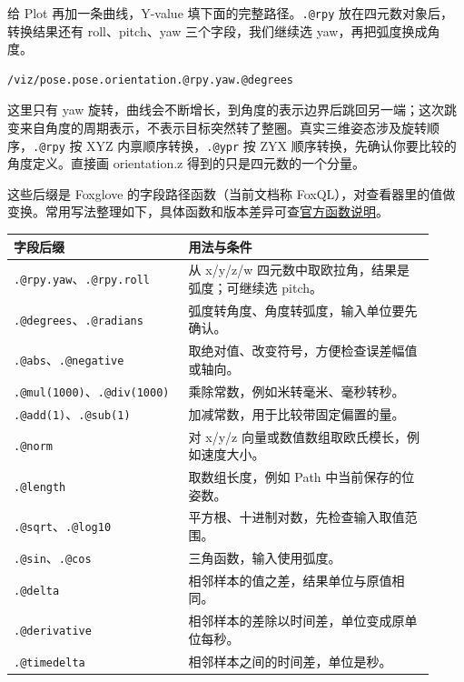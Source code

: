 \begin{example}
给 Plot 再加一条曲线，Y-value 填下面的完整路径。\texttt{.@rpy} 放在四元数对象后，转换结果还有 roll、pitch、yaw 三个字段，我们继续选 yaw，再把弧度换成角度。
\begin{lstlisting}[language={}]
/viz/pose.pose.orientation.@rpy.yaw.@degrees
\end{lstlisting}
这里只有 yaw 旋转，曲线会不断增长，到角度的表示边界后跳回另一端；这次跳变来自角度的周期表示，不表示目标突然转了整圈。真实三维姿态涉及旋转顺序，\texttt{.@rpy} 按 XYZ 内禀顺序转换，\texttt{.@ypr} 按 ZYX 顺序转换，先确认你要比较的角度定义。直接画 orientation.z 得到的只是四元数的一个分量。

这些后缀是 Foxglove 的字段路径函数（当前文档称 FoxQL），对查看器里的值做变换。常用写法整理如下，具体函数和版本差异可查\href{https://docs.foxglove.dev/docs/visualization/foxql}{官方函数说明}。
\begin{center}
\begin{tabular}{p{0.35\linewidth}p{0.57\linewidth}}
\toprule
字段后缀 & 用法与条件\\
\midrule
\nolinkurl{.@rpy.yaw}、\nolinkurl{.@rpy.roll} & 从 x/y/z/w 四元数中取欧拉角，结果是弧度；可继续选 pitch。\\
\nolinkurl{.@degrees}、\nolinkurl{.@radians} & 弧度转角度、角度转弧度，输入单位要先确认。\\
\nolinkurl{.@abs}、\nolinkurl{.@negative} & 取绝对值、改变符号，方便检查误差幅值或轴向。\\
\nolinkurl{.@mul(1000)}、\nolinkurl{.@div(1000)} & 乘除常数，例如米转毫米、毫秒转秒。\\
\nolinkurl{.@add(1)}、\nolinkurl{.@sub(1)} & 加减常数，用于比较带固定偏置的量。\\
\nolinkurl{.@norm} & 对 x/y/z 向量或数值数组取欧氏模长，例如速度大小。\\
\nolinkurl{.@length} & 取数组长度，例如 Path 中当前保存的位姿数。\\
\nolinkurl{.@sqrt}、\nolinkurl{.@log10} & 平方根、十进制对数，先检查输入取值范围。\\
\nolinkurl{.@sin}、\nolinkurl{.@cos} & 三角函数，输入使用弧度。\\
\nolinkurl{.@delta} & 相邻样本的值之差，结果单位与原值相同。\\
\nolinkurl{.@derivative} & 相邻样本的差除以时间差，单位变成原单位每秒。\\
\nolinkurl{.@timedelta} & 相邻样本之间的时间差，单位是秒。\\
\bottomrule
\end{tabular}
\end{center}


\end{example}
